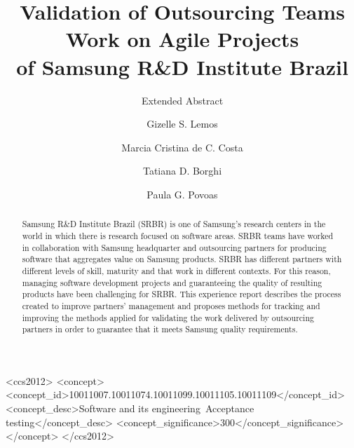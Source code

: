 \documentclass[sigconf]{acmart}
\begin{document}
\title{Validation of Outsourcing Teams Work on Agile Projects\\
of Samsung R\&D Institute Brazil}
\subtitle{Extended Abstract}

\author{Gizelle S. Lemos}

\author{Marcia Cristina de C. Costa}

\author{Tatiana D. Borghi}

\author{Paula G. Povoas}

\renewcommand{\shortauthors}{G. S. Lemos et al.}

\begin{abstract}
Samsung R\&D Institute Brazil (SRBR) is one of Samsung's research centers in the world in which there is research focused on software areas. SRBR teams have worked in collaboration with Samsung headquarter and outsourcing partners for producing software that aggregates value on Samsung products. SRBR has different partners with different levels of skill, maturity and that work in different contexts. For this reason, managing software development projects and guaranteeing the quality of resulting products have been challenging for SRBR. This experience report describes the process created to improve partners' management and proposes methods for tracking and improving the methods applied for validating the work delivered by outsourcing partners in order to guarantee that it meets Samsung quality requirements. 
\end{abstract}

\begin{CCSXML}
<ccs2012>
<concept>
<concept_id>10011007.10011074.10011099.10011105.10011109</concept_id>
<concept_desc>Software and its engineering~Acceptance testing</concept_desc>
<concept_significance>300</concept_significance>
</concept>
</ccs2012>
\end{CCSXML}




\maketitle





\end{document}
